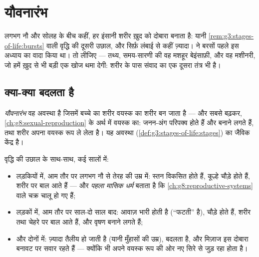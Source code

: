 \chapter{यौवनारंभ}\label{ch:g8:puberty}

लगभग नौ और सोलह के बीच कहीं, हर इंसानी शरीर ख़ुद को दोबारा बनाता है:
यानी \cref{rem:g3:stages-of-life:bursts} वाली वृद्धि की दूसरी उछाल, और
सिर्फ़ लंबाई से कहीं ज़्यादा।
 ने बरसों पहले इस अध्याय का वादा
किया था। तो लीजिए --- तथ्य, समय-सारणी की वह मशहूर बेइंसाफ़ी, और वह
मशीनरी, जो हमें ख़ुद  से भी बड़ी एक खोज थमा देगी: शरीर के पास
संवाद का एक दूसरा तंत्र भी है।

\section{क्या-क्या बदलता है}

\begin{definition}[यौवनारंभ]\label{def:g8:puberty:puberty}
\emph{यौवनारंभ} वह अवस्था है जिसमें बच्चे का शरीर
वयस्क का शरीर बन जाता है --- और सबसे बढ़कर,
\cref{ch:g8:sexual-reproduction} के अर्थ में वयस्क का: जनन-अंग परिपक्व
होते हैं और \emph{} बनाने लगते हैं, तथा शरीर अपना वयस्क रूप ले
लेता है। यह  अवस्था (\cref{def:g3:stages-of-life:stages}) का
जैविक केंद्र है।
\end{definition}

\begin{proposition}[दिखने वाले बदलाव]\label{prop:g8:puberty:changes}
वृद्धि की उछाल के साथ-साथ, कई सालों में:
\begin{itemize}
  \item लड़कियों में, आम तौर पर लगभग नौ से तेरह की उम्र में: स्तन
        विकसित होते हैं, कूल्हे चौड़े होते हैं, शरीर पर बाल आते हैं
        --- और \emph{पहला मासिक धर्म} बताता है कि
        \cref{ch:g8:reproductive-systems} वाले चक्र चालू हो गए हैं;
  \item लड़कों में, आम तौर पर साल-दो साल बाद: आवाज़ भारी होती है
        (``फटती'' है),  चौड़े होते हैं, शरीर तथा चेहरे पर बाल आते
        हैं, और वृषण  बनाने लगते हैं;
  \item और दोनों में:  ज़्यादा तैलीय हो जाती है (यानी मुँहासों की
        उम्र),  बदलता है, और मिज़ाज इस दोबारा बनावट पर सवार रहते
        हैं --- क्योंकि  भी अपने वयस्क रूप की ओर नए सिरे से
        जुड़ रहा होता है।
\end{itemize}
\end{proposition}
\admitted

